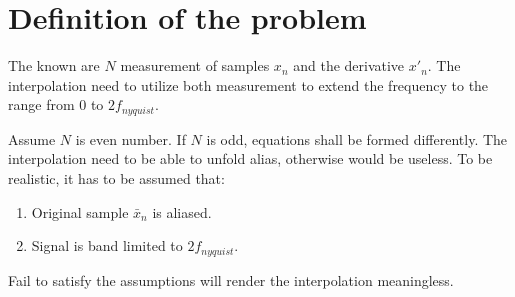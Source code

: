 \documentclass[12pt]{article}
\begin{document}
\section{Definition of the problem}
The known are $N$ measurement of samples $x_n$ and the derivative $x'_n$.
The interpolation need to utilize both measurement 
to extend the frequency to the range from $0$ to $2f_{nyquist}$.

Assume $N$ is even number. If $N$ is odd, equations shall be formed differently. 
The interpolation need to be able to unfold alias, otherwise would be useless. 
To be realistic, it has to be assumed that:
\begin{enumerate}
    \item Original sample $\bar{x}_n$ is aliased.
    \item Signal is band limited to $2f_{nyquist}$.
\end{enumerate}
Fail to satisfy the assumptions will render the interpolation meaningless.
\end{document}
